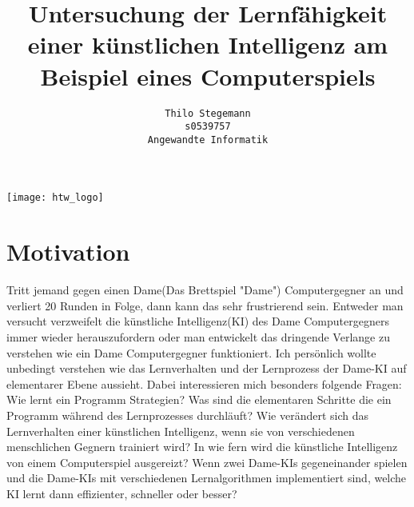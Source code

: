 \documentclass[12pt,a4paper]{scrartcl}
\begin{document}
\subject{Exposé Bachelorarbeit}
\author{
	\texttt{Thilo Stegemann}\\
	\texttt{s0539757}\\
	\texttt{Angewandte Informatik}}
\title{Untersuchung der Lernfähigkeit einer künstlichen Intelligenz am Beispiel eines Computerspiels}

\maketitle
\centerline{\texttt{[image: htw\_logo]}}

\section*{Motivation}


Tritt jemand gegen einen Dame(Das Brettspiel "Dame") Computergegner an und verliert 20 Runden in Folge, dann kann das sehr frustrierend sein. Entweder man versucht verzweifelt die künstliche Intelligenz(KI) des Dame Computergegners immer wieder herauszufordern oder man entwickelt das dringende Verlange zu verstehen wie ein Dame Computergegner funktioniert. Ich persönlich wollte unbedingt verstehen wie das Lernverhalten und der Lernprozess der Dame-KI auf elementarer Ebene aussieht. Dabei interessieren mich besonders folgende Fragen:\\       

Wie lernt ein Programm Strategien? Was sind die elementaren Schritte die ein Programm  während des Lernprozesses durchläuft? Wie verändert sich das Lernverhalten einer künstlichen Intelligenz, wenn sie von verschiedenen menschlichen Gegnern trainiert wird? In wie fern wird die künstliche Intelligenz von einem Computerspiel ausgereizt? Wenn zwei Dame-KIs gegeneinander spielen und die Dame-KIs mit verschiedenen Lernalgorithmen implementiert sind, welche KI lernt dann effizienter, schneller oder besser?
\end{document}
